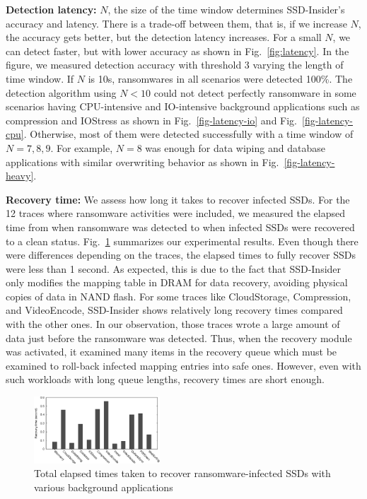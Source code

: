 \documentclass[conference]{IEEEtran}
\newcommand{\ours}{SSD-Insider}
\begin{document}
{\bf Detection latency:}
$N$, the size of the time window determines \ours{}'s accuracy and latency. 
There is a trade-off between them, that is, if we increase $N$, the accuracy gets better, but the detection latency
increases. For a small $N$, we can detect faster, but with lower accuracy as shown in Fig.~\ref{fig:latency}. 
In the figure, we measured detection accuracy with threshold 3 varying the length of time window. 
If $N$ is 10s, ransomwares in all scenarios were detected 100\%. 
The detection algorithm using $N<10$ could not detect perfectly ransomware in some scenarios having 
CPU-intensive and IO-intensive background applications such as compression and IOStress as shown in 
Fig.~\ref{fig-latency-io} and Fig.~\ref{fig-latency-cpu}. 
Otherwise, most of them were detected successfully with a time window of $N=7,8,9$.
For example, $N=8$ was enough for data wiping and database applications with similar overwriting behavior
as shown in Fig.~\ref{fig-latency-heavy}.

{\bf Recovery time:}
We assess how long it takes to recover infected SSDs. For the 12
traces where ransomware activities were included, we measured the
elapsed time from when ransomware was detected to when infected
SSDs were recovered to a clean status. Fig.~\ref{fig:flash-recovery}
summarizes our experimental results. Even though there were
differences depending on the traces, the elapsed times to fully
recover SSDs were less than 1 second. As expected, this is due to
the fact that \ours{} only modifies the mapping table in DRAM
for data recovery, avoiding physical copies of data in NAND flash.
For some traces like CloudStorage, Compression, and VideoEncode, \ours{}
shows relatively long recovery times compared with the other ones.
In our observation, those traces wrote a large amount of data just
before the ransomware was detected. Thus, when the recovery module
was activated, it examined many items in the recovery queue which must
be examined to roll-back infected mapping entries into safe ones.
However, even with such workloads with long queue lengths, recovery
times are short enough.

\begin{figure}[t] 
	\centering 
	\includegraphics[width=0.42\textwidth]{exp/recovery/fig}
	\caption{Total elapsed times taken to recover ransomware-infected SSDs with various background applications} 
	\label{fig:flash-recovery} 
\end{figure}
\end{document}
